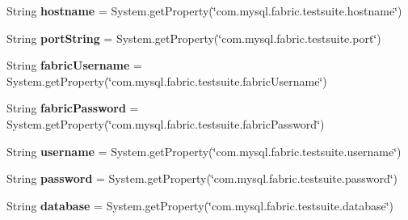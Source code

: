\begin{DoxyCompactItemize}
\item 
\mbox{\label{classtestsuite_1_1fabric_1_1_base_fabric_test_case_a89038cf3b03d74fee877c6a441e3b6e8}} 
String {\bfseries hostname} = System.\+get\+Property(\char`\"{}com.\+mysql.\+fabric.\+testsuite.\+hostname\char`\"{})
\item 
\mbox{\label{classtestsuite_1_1fabric_1_1_base_fabric_test_case_aa65476cc4a0c32d21b396b293f177ad1}} 
String {\bfseries port\+String} = System.\+get\+Property(\char`\"{}com.\+mysql.\+fabric.\+testsuite.\+port\char`\"{})
\item 
\mbox{\label{classtestsuite_1_1fabric_1_1_base_fabric_test_case_ae560bb641ed3153e71ab5d3e143e56ac}} 
String {\bfseries fabric\+Username} = System.\+get\+Property(\char`\"{}com.\+mysql.\+fabric.\+testsuite.\+fabric\+Username\char`\"{})
\item 
\mbox{\label{classtestsuite_1_1fabric_1_1_base_fabric_test_case_a942102f1f4c991dfcd7ed593bc4d0dda}} 
String {\bfseries fabric\+Password} = System.\+get\+Property(\char`\"{}com.\+mysql.\+fabric.\+testsuite.\+fabric\+Password\char`\"{})
\item 
\mbox{\label{classtestsuite_1_1fabric_1_1_base_fabric_test_case_a0c71c63d2c9cab3a0a7d892832c2f8df}} 
String {\bfseries username} = System.\+get\+Property(\char`\"{}com.\+mysql.\+fabric.\+testsuite.\+username\char`\"{})
\item 
\mbox{\label{classtestsuite_1_1fabric_1_1_base_fabric_test_case_ab81f23252f44cfd205ae2b9cdf24e1d4}} 
String {\bfseries password} = System.\+get\+Property(\char`\"{}com.\+mysql.\+fabric.\+testsuite.\+password\char`\"{})
\item 
\mbox{\label{classtestsuite_1_1fabric_1_1_base_fabric_test_case_ad619b8d5c96ed2b9388bcbcc73e0a8eb}} 
String {\bfseries database} = System.\+get\+Property(\char`\"{}com.\+mysql.\+fabric.\+testsuite.\+database\char`\"{})

\end{DoxyCompactItemize}
